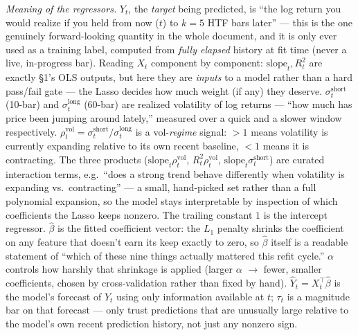 \documentclass[11pt]{article}
\newcommand{\meaningpar}[1]{\par\noindent\textit{Meaning of the regressors.} #1}
\begin{document}
\meaningpar{$Y_t$, the \emph{target} being predicted, is ``the log return you would realize if you
held from now ($t$) to $k=5$ HTF bars later'' --- this is the one genuinely forward-looking
quantity in the whole document, and it is only ever used as a training label, computed from
\emph{fully elapsed} history at fit time (never a live, in-progress bar).
Reading $X_t$ component by component: $\mathrm{slope}_t,R^2_t$ are exactly \S1's OLS
outputs, but here they are \emph{inputs} to a model rather than a hard pass/fail gate --- the
Lasso decides how much weight (if any) they deserve. $\sigma^{\mathrm{short}}_t$ (10-bar) and
$\sigma^{\mathrm{long}}_t$ (60-bar) are realized volatility of log returns --- ``how much has
price been jumping around lately,'' measured over a quick and a slower window respectively.
$\rho^{\mathrm{vol}}_t=\sigma^{\mathrm{short}}_t/\sigma^{\mathrm{long}}_t$ is a vol-\emph{regime}
signal: $>1$ means volatility is currently expanding relative to its own recent baseline, $<1$
means it is contracting. The three products
($\mathrm{slope}_t\rho^{\mathrm{vol}}_t$, $R^2_t\rho^{\mathrm{vol}}_t$,
$\mathrm{slope}_t\sigma^{\mathrm{short}}_t$) are curated interaction terms, e.g.\ ``does a strong
trend behave differently when volatility is expanding vs.\ contracting'' --- a small, hand-picked
set rather than a full polynomial expansion, so the model stays interpretable by inspection of
which coefficients the Lasso keeps nonzero. The trailing constant $1$ is the intercept regressor.
$\hat\beta$ is the fitted coefficient vector: the $L_1$ penalty shrinks the coefficient on any
feature that doesn't earn its keep exactly to zero, so $\hat\beta$ itself is a readable statement
of ``which of these nine things actually mattered this refit cycle.'' $\alpha$ controls how harshly
that shrinkage is applied (larger $\alpha$ $\to$ fewer, smaller coefficients, chosen by
cross-validation rather than fixed by hand). $\hat Y_t=X_t^\top\hat\beta$ is the model's forecast
of $Y_t$ using only information available at $t$; $\tau_t$ is a magnitude bar on that forecast ---
only trust predictions that are unusually large relative to the model's own recent prediction
history, not just any nonzero sign.}
\end{document}
